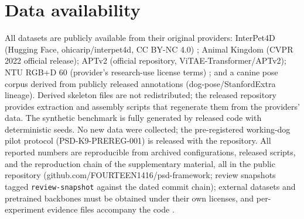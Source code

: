 \documentclass[a4paper,fleqn]{cas-sc}
\begin{document}
\section*{Data availability}
All datasets are publicly available from their original providers: InterPet4D (Hugging Face, ohicarip/interpet4d, CC BY-NC 4.0)%
; Animal Kingdom (CVPR 2022 official release); APTv2 (official repository, ViTAE-Transformer/APTv2); NTU RGB+D 60 (provider's research-use license terms)%
; and a canine pose corpus derived from publicly released annotations (dog-pose/StanfordExtra lineage). Derived skeleton files are not redistributed; the released repository provides extraction and assembly scripts that regenerate them from the providers' data. The synthetic benchmark is fully generated by released code with deterministic seeds. No new data were collected; the pre-registered working-dog pilot protocol (PSD-K9-PREREG-001) is released with the repository.
All reported numbers are reproducible from archived configurations, released scripts, and the reproduction chain of the supplementary material, all in the public repository (github.com/FOURTEEN1416/psd-framework; review snapshots tagged \texttt{review-snapshot} against the dated commit chain); external datasets and pretrained backbones must be obtained under their own licenses, and per-experiment evidence files accompany the code%
.
\end{document}
